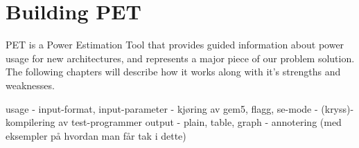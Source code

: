 \chapter{Building PET}
PET is a Power Estimation Tool that provides guided information about power
usage for new architectures, and represents a major piece of our problem
solution. The following chapters will describe how it works along with it's
strengths and weaknesses.







usage
- input-format, input-parameter
- kjøring av gem5, flagg, se-mode
- (kryss)-kompilering av test-programmer
output
- plain, table, graph
- annotering (med eksempler på hvordan man får tak i dette)

